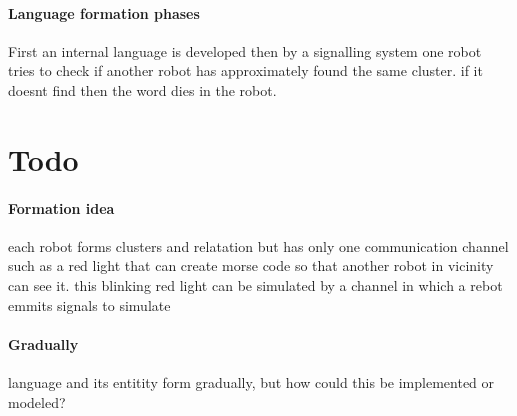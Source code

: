 \paragraph{Language formation phases}
First an internal language is developed then by a signalling system one robot tries to check if another robot has approximately found the same cluster. if it doesnt find then the word dies in the robot.

\section{Todo}
\paragraph{Formation idea}
    each robot  forms clusters and relatation but has only one communication channel such as a red light that can create morse code so that another robot in vicinity can see it. this blinking red light can be simulated by a channel in which a rebot emmits signals to simulate

\paragraph{Gradually}
    language and its entitity form gradually, but how could this be implemented or modeled?


